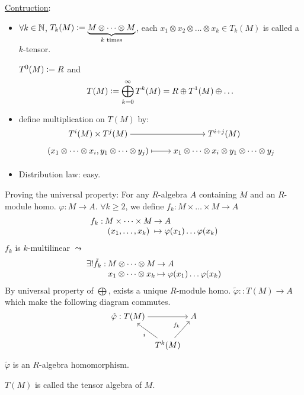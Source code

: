 \underline{Contruction}:
\begin{itemize}
  \item $\forall k \in \mathbb{N}$, $T_k(M) \vcentcolon=
    \underbrace{M\otimes \dots \otimes M}_{k \text{~times}}$, each
    $x_1\otimes x_2\otimes \dots \otimes x_k \in T_k(M)$ is called a $k$-tensor.

    $T^0(M) \vcentcolon= R$ and
    \[
      T(M) \vcentcolon= \bigoplus_{k=0}^\infty T^k(M) = R \oplus T^1(M) \oplus \dots
    \]
  \item define multiplication on $T(M)$ by:
    \[
      \begin{tikzcd}[cramped, row sep=tiny]
        T^i(M) \times T^j(M) \arrow[r] & T^{i+j}(M) \\
        (x_1\otimes \dots \otimes x_i, y_1\otimes \dots \otimes y_j)
        \arrow[r, mapsto]
        & x_1\otimes \dots \otimes x_i\otimes y_1\otimes \dots\otimes y_j \\
      \end{tikzcd}
    \]
  \item Distribution law: easy.
\end{itemize}

Proving the universal property:
For any $R$-algebra $A$ containing $M$ and an $R$-module homo.
$\varphi: M \to A$.
$\forall k \ge 2$, we define
$f_k: M \times \dots \times M \to A$
\[
  \arraycolsep=1pt
  \begin{array}{rcl}
    f_k: & M \times \dots \times M & \to A \\
         & (x_1, \dots, x_k) & \mapsto
    \varphi(x_1) \dots \varphi(x_k)
  \end{array}
\]
$f_k$ is $k$-multilinear $\leadsto$
\[
  \arraycolsep=1pt
  \begin{array}{rcl}
    \exists! \tilde{f_k}: & M \otimes \dots \otimes M & \to A \\
         & x_1 \otimes \dots\otimes x_k & \mapsto
    \varphi(x_1) \dots \varphi(x_k)
  \end{array}
\]
By universal property of $\bigoplus$, exists a unique $R$-module homo.
$\tilde\varphi :: T(M) \to A$ which make the following diagram commutes.
\[
  \begin{tikzcd}[cramped, column sep=tiny]
    \tilde\varphi: T(M) \arrow{rr} & & A \\
      & T^k(M) \arrow{ul}{i} \arrow{ur}{f_k} &
  \end{tikzcd}
\]

$\tilde\varphi$ is an $R$-algebra homomorphism.

\begin{definition}
  $T(M)$ is called the tensor algebra of $M$.
\end{definition}


